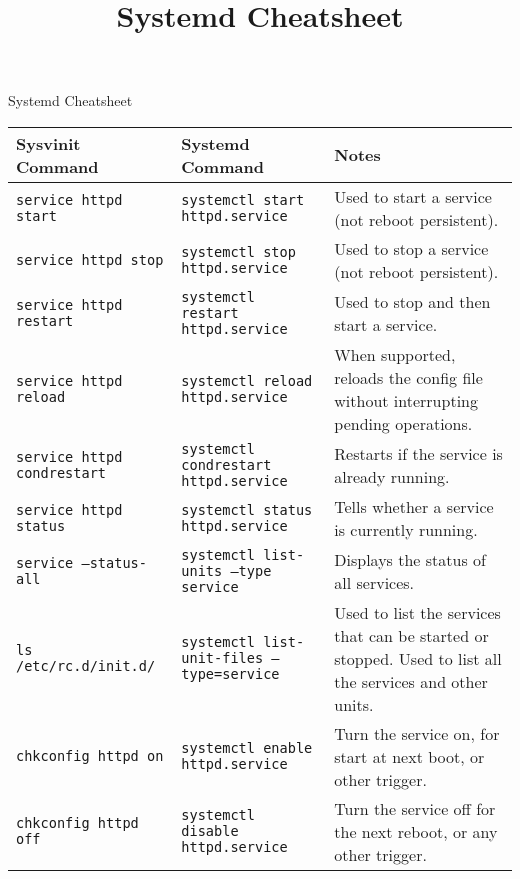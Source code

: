 \documentclass[a4paper]{article}
\title{Systemd Cheatsheet}
\begin{document}
\begin{center}

{\huge Systemd Cheatsheet}

\vspace{7mm}
\small

\begin{tabularx}{\textwidth}{ |l|X|X| }
\hline
\rowcolor[gray]{.8}
\bfseries Sysvinit Command    & \bfseries Systemd Command                                                             & \bfseries Notes \\\hline
\tt service httpd start       & \tt systemctl start httpd.service                                                     & Used to start a service (not reboot persistent). \\\hline
\tt service httpd stop        & \tt systemctl stop httpd.service                                                      & Used to stop a service (not reboot persistent). \\\hline
\tt service httpd restart     & \tt systemctl restart httpd.service                                                   & Used to stop and then start a service. \\\hline
\tt service httpd reload      & \tt systemctl reload httpd.service                                                    & When supported, reloads the config file without interrupting pending operations. \\\hline
\tt service httpd condrestart & \tt systemctl condrestart httpd.service                                               & Restarts if the service is already running. \\\hline
\tt service httpd status      & \tt systemctl status httpd.service                                                    & Tells whether a service is currently running. \\\hline
\tt service --status-all      & \tt systemctl list-units --type service                                               & Displays the status of all services. \\\hline
\tt ls /etc/rc.d/init.d/      & \tt systemctl list-unit-files --type=service                                          & Used to list the services that can be started or stopped. Used to list all the services and other units. \\\hline
\tt chkconfig httpd on        & \tt systemctl enable httpd.service                                                    & Turn the service on, for start at next boot, or other trigger. \\\hline
\tt chkconfig httpd off       & \tt systemctl disable httpd.service                                                   & Turn the service off for the next reboot, or any other trigger. \\\hline

\end{tabularx}
\end{center}
\end{document}
